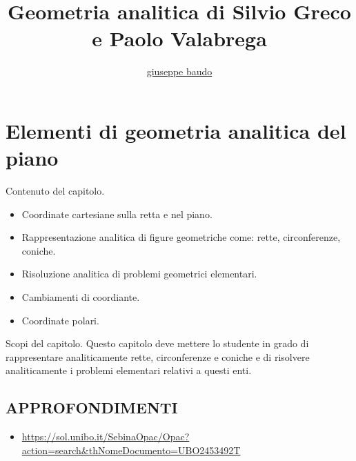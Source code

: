 \documentclass[a4paper,10pt]{book}
\title{Geometria analitica di Silvio Greco e Paolo Valabrega}
\author{\href{http://www.baudo.hol.es}{giuseppe baudo}}
\begin{document}
\maketitle

\chapter{Elementi di geometria analitica del piano}

Contenuto del capitolo.
\begin{itemize}
 \item Coordinate cartesiane sulla retta e nel piano.
 \item Rappresentazione analitica di figure geometriche come: rette, circonferenze, coniche.
 \item Risoluzione analitica di problemi geometrici elementari.
 \item Cambiamenti di coordiante.
 \item Coordinate polari.
\end{itemize}

Scopi del capitolo. Questo capitolo deve mettere lo studente in grado di rappresentare analiticamente rette, circonferenze e coniche
e di risolvere analiticamente i problemi elementari relativi a questi enti.


\section{APPROFONDIMENTI}
\begin{itemize}
 \item \url{https://sol.unibo.it/SebinaOpac/Opac?action=search&thNomeDocumento=UBO2453492T}
\end{itemize}
\end{document}
